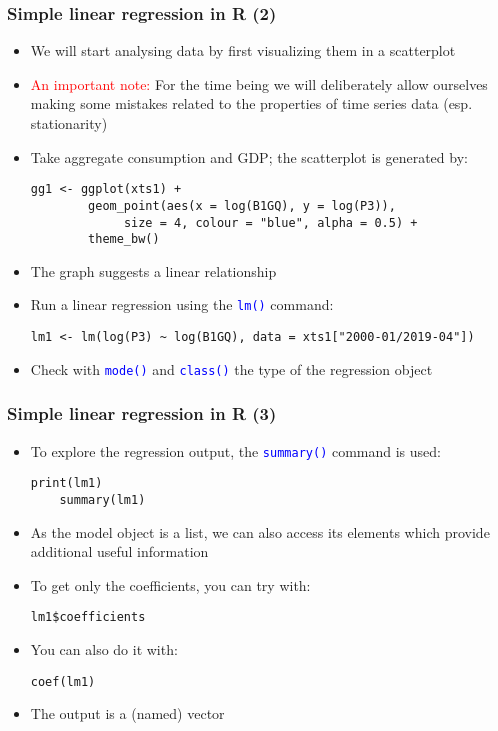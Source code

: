 \documentclass[10pt]{beamer}
\newcommand{\cc}[1]{\texttt{\textcolor{blue}{#1}}}
\theoremstyle{definition}
\begin{document}
\begin{frame}[fragile]
\frametitle{Simple linear regression in R (2)}
\begin{itemize}
	\item We will start analysing data by first visualizing them in a scatterplot
	\item \textcolor{red}{An important note:} For the time being we will deliberately allow ourselves making some mistakes related to the properties of time series data (esp. stationarity)
	\item Take aggregate consumption and GDP; the scatterplot is generated by:
	\begin{lstlisting}[style = rstyle, breaklines]
	gg1 <- ggplot(xts1) + 
		geom_point(aes(x = log(B1GQ), y = log(P3)),
             size = 4, colour = "blue", alpha = 0.5) + 
		theme_bw()
	\end{lstlisting}
	\item The graph suggests a linear relationship
	\item Run a linear regression using the \cc{lm()} command:
	\begin{lstlisting}[style = rstyle, breaklines]
	lm1 <- lm(log(P3) ~ log(B1GQ), data = xts1["2000-01/2019-04"])
	\end{lstlisting}
	\item Check with \cc{mode()} and \cc{class()} the type of the regression object
\end{itemize}
\end{frame}

\begin{frame}[fragile]
\frametitle{Simple linear regression in R (3)}
\begin{itemize}
	\item To explore the regression output, the \cc{summary()} command is used:
	\begin{lstlisting}[style = rstyle, breaklines]
	print(lm1)
	summary(lm1)
	\end{lstlisting}
	\item As the model object is a list, we can also access its elements which provide additional useful information
	\item To get only the coefficients, you can try with:
	\begin{lstlisting}[style = rstyle, breaklines]
	lm1$coefficients
	\end{lstlisting}
	\item You can also do it with:
	\begin{lstlisting}[style = rstyle, breaklines]
	coef(lm1)
	\end{lstlisting}
	\item The output is a (named) vector
\end{itemize}
\end{frame}
\end{document}

